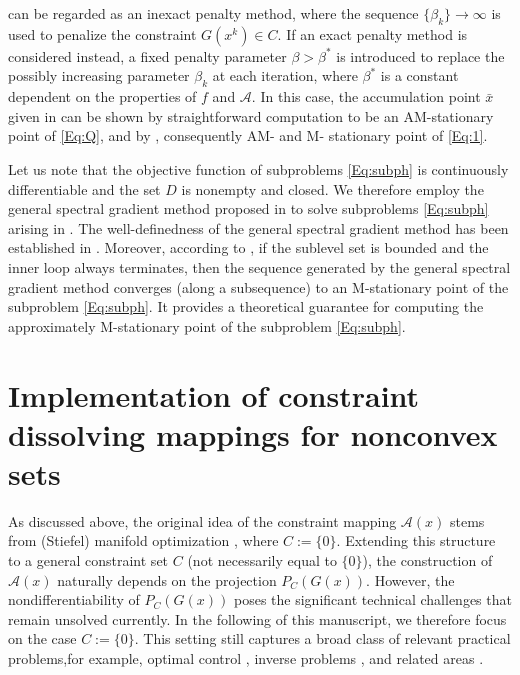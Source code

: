 \documentclass[11pt,a4paper,reqno]{amsart}
\begin{document}
{  can be regarded as an inexact penalty method, where the sequence $\{\beta_k\}\to \infty$ is used to penalize the constraint $G(x^k)\in C$. If an exact penalty method is considered instead, a fixed penalty parameter $\beta>\beta^*$ is introduced to replace the possibly increasing parameter $\beta_k$ at each iteration, where $\beta^*$ is a constant dependent on the properties of $f$ and $\mathcal A$. In this case, the accumulation point $\bar x$ given in  can be shown by straightforward computation to be an AM-stationary point of \eqref{Eq:Q}, and by , consequently AM- and M- stationary point of \eqref{Eq:1}.

Let us note that the objective function of subproblems \eqref{Eq:subph} is continuously differentiable and the set $D$ is nonempty and closed. We therefore employ the general spectral gradient method proposed in \cite[Algorithm~3.1]{jia2023augmented} to solve subproblems \eqref{Eq:subph} arising in . The well-definedness of the general spectral gradient method has been established in \cite[Proposition~3.1]{jia2023augmented}. Moreover, according to \cite[Theorem~3.4]{jia2023augmented}, if the sublevel set is bounded and the inner loop always terminates, then the sequence generated by the general spectral gradient method converges (along a subsequence) to an M-stationary point of the subproblem \eqref{Eq:subph}. It provides a theoretical guarantee for computing the approximately M-stationary point of the subproblem \eqref{Eq:subph}.

\section{Implementation of constraint dissolving mappings for nonconvex sets}\label{Sub:imp}
As discussed above, the original idea of the constraint mapping $\mathcal A(x)$ stems from (Stiefel) manifold optimization \cite{xiao2024solving}, where $C:=\{0\}$. Extending this structure to a general constraint set $C$ (not necessarily equal to $\{0\}$), the construction of $\mathcal A(x)$ naturally depends on the projection $P_C(G(x))$. However, the nondifferentiability of $P_C(G(x))$ poses the significant technical challenges that remain unsolved currently. In the following of this manuscript, we therefore focus on the case $C:=\{0\}$. This setting still captures a broad class of relevant practical problems,for example, optimal control \cite{harder2021reformulation}, inverse problems \cite{basir2022physics}, and related areas \cite{higham2002computing,xiao2024dissolving,xiao2026exact,qi2006quadratically}. 

}
\end{document}
